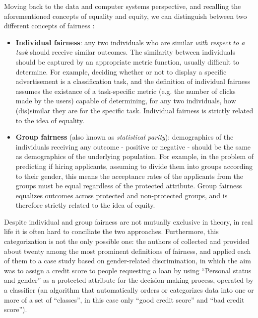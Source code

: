 Moving back to the data and computer systems perspective, and recalling the aforementioned concepts of equality and equity, we can distinguish between two different concepts of fairness \cite{dwork2012fairness}:
\begin{itemize}
\item \textbf{Individual fairness}: any two individuals who are similar \textit{with respect to a task} should receive similar outcomes. The similarity between individuals should be captured by an appropriate metric function, usually difficult to determine. For example, deciding whether or not to display a specific advertisement is a classification task, and the definition of individual fairness assumes the existance of a task-specific metric (e.g. the number of clicks made by the users) capable of determining, for any two individuals, how (dis)similar they are for the specific task. Individual fairness is strictly related to the idea of equality.
\item \textbf{Group fairness} (also known as \textit{statistical parity}): demographics of the individuals receiving any outcome - positive or negative - should be the same as demographics of the underlying population. For example, in the problem of predicting if hiring applicants, assuming to divide them into groups according to their gender, this means the acceptance rates of the applicants from the groups must be equal regardless of the protected attribute. Group fairness equalizes outcomes across protected and non-protected groups, and is therefore strictly related to the idea of equity.
\end{itemize}

Despite individual and group fairness are not mutually exclusive in theory, in real life it is often hard to conciliate the two approaches. Furthermore, this categorization is not the only possible one: the authors of \cite{verma2018fairness} collected and provided about twenty among the most prominent definitions of fairness, and applied each of them to a case study based on gender-related discrimination, in which the aim was to assign a credit score to people requesting a loan by using ``Personal status and gender'' as a protected attribute for the decision-making process, operated by a classifier (an algorithm that automatically orders or categorizes data into one or more of a set of ``classes'', in this case only ``good credit score'' and ``bad credit score'').

